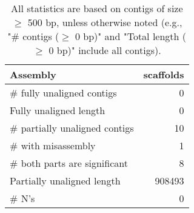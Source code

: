 \documentclass[12pt,a4paper]{article}
\begin{document}
\begin{table}[ht]
\begin{center}
\caption{All statistics are based on contigs of size $\geq$ 500 bp, unless otherwise noted (e.g., "\# contigs ($\geq$ 0 bp)" and "Total length ($\geq$ 0 bp)" include all contigs).}
\begin{tabular}{|l*{1}{|r}|}
\hline
Assembly & scaffolds \\ \hline
\# fully unaligned contigs & 0 \\ \hline
Fully unaligned length & 0 \\ \hline
\# partially unaligned contigs & 10 \\ \hline
\hspace{5mm}\# with misassembly & 1 \\ \hline
\hspace{5mm}\# both parts are significant & 8 \\ \hline
Partially unaligned length & 908493 \\ \hline
\# N's & 0 \\ \hline
\end{tabular}
\end{center}
\end{table}
\end{document}
